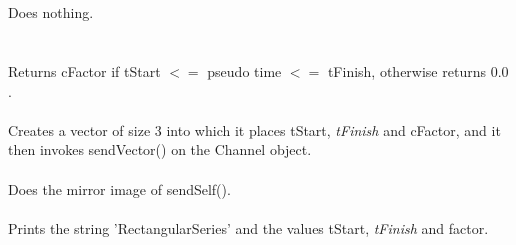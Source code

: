  \\
\\ 
Does nothing. \\

 \\
\\
Returns cFactor if tStart $<=$ pseudo time $<=$ tFinish, otherwise
returns $0.0$. \\ 

\\
Creates a vector of size 3 into which it places \p tStart, {\em
tFinish} and \p cFactor, and it then invokes sendVector() on
the Channel object. \\ 

\\
Does the mirror image of sendSelf(). \\

\\
Prints the string 'RectangularSeries' and the values \p tStart, {\em
tFinish} and \p factor. 
